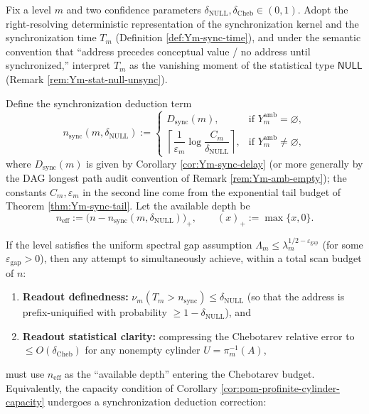 \begin{theorem}\label{thm:pom-sync-subtracted-chebotarev-capacity}
Fix a level \(m\) and two confidence parameters \(\delta_{\mathrm{NULL}},\delta_{\mathrm{Cheb}}\in(0,1)\).
Adopt the right-resolving deterministic representation of the synchronization kernel and the synchronization time \(T_m\) (Definition \ref{def:Ym-sync-time}), and under the semantic convention that ``address precedes conceptual value / no address until synchronized,'' interpret \(T_m\) as the vanishing moment of the statistical type \(\mathsf{NULL}\) (Remark \ref{rem:Ym-stat-null-unsync}).
\par
Define the synchronization deduction term
\[
n_{\mathrm{sync}}(m,\delta_{\mathrm{NULL}})
:=
\begin{cases}
D_{\mathrm{sync}}(m), & \text{if }Y_m^{\mathrm{amb}}=\varnothing,\\[6pt]
\left\lceil \dfrac{1}{\varepsilon_m}\log\dfrac{C_m}{\delta_{\mathrm{NULL}}}\right\rceil,
& \text{if }Y_m^{\mathrm{amb}}\neq\varnothing,
\end{cases}
\]
where \(D_{\mathrm{sync}}(m)\) is given by Corollary \ref{cor:Ym-sync-delay} (or more generally by the DAG longest path audit convention of Remark \ref{rem:Ym-amb-empty});
the constants \(C_m,\varepsilon_m\) in the second line come from the exponential tail budget of Theorem \ref{thm:Ym-sync-tail}.
Let the available depth be
\[
n_{\mathrm{eff}}:=\bigl(n-n_{\mathrm{sync}}(m,\delta_{\mathrm{NULL}})\bigr)_+,
\qquad (x)_+:=\max\{x,0\}.
\]
\par
If the level satisfies the uniform spectral gap assumption
\(
\Lambda_m\le \lambda_m^{1/2-\varepsilon_{\mathrm{gap}}}
\)
(for some \(\varepsilon_{\mathrm{gap}}>0\)), then any attempt to simultaneously achieve, within a total scan budget of \(n\):
\begin{enumerate}
  \item \textbf{Readout definedness:} \(\nu_m(T_m>n_{\mathrm{sync}})\le \delta_{\mathrm{NULL}}\) (so that the address is prefix-uniquified with probability \(\ge 1-\delta_{\mathrm{NULL}}\)), and
  \item \textbf{Readout statistical clarity:} compressing the Chebotarev relative error to \(\le O(\delta_{\mathrm{Cheb}})\) for any nonempty cylinder \(U=\pi_m^{-1}(A)\),
\end{enumerate}
must use \(n_{\mathrm{eff}}\) as the ``available depth'' entering the Chebotarev budget. Equivalently, the capacity condition of Corollary \ref{cor:pom-profinite-cylinder-capacity} undergoes a synchronization deduction correction:

\end{theorem}
